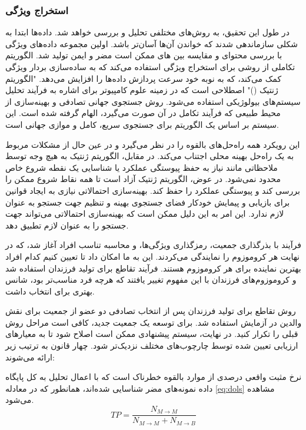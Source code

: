 \documentclass{CSICC2020}
\begin{document}
	\subsubsection{استخراج ویژگی}
	در طول این تحقیق،  به روش‌های مختلفی تحلیل و بررسی خواهد شد. داده‌ها ابتدا به شکلی سازماندهی شدند که خواندن آن‌ها آسان‌تر باشد. اولین مجموعه داده‌های ویژگی با بررسی محتوای  و مقایسه بین های ممکن است مضر و ایمن تولید شد. الگوریتم تکاملی از روشی برای استخراج ویژگی استفاده می‌کند که به ساده‌سازی بردار ویژگی کمک می‌کند، که به نوبه خود سرعت پردازش داده‌ها را افزایش می‌دهد. "الگوریتم ژنتیک ()" اصطلاحی است که در زمینه علوم کامپیوتر برای اشاره به فرآیند تحلیل سیستم‌های بیولوژیکی استفاده می‌شود. روش جستجوی جهانی تصادفی و بهینه‌سازی از محیط طبیعی که فرآیند تکامل در آن صورت می‌گیرد، الهام گرفته شده است. این سیستم بر اساس یک الگوریتم برای جستجوی سریع، کامل و موازی جهانی است.
	
	این رویکرد همه راه‌حل‌های بالقوه را در نظر می‌گیرد و در عین حال از مشکلات مربوط به یک راه‌حل بهینه محلی اجتناب می‌کند. در مقابل، الگوریتم ژنتیک به هیچ وجه توسط ملاحظاتی مانند نیاز به حفظ پیوستگی عملکرد یا شناسایی یک نقطه شروع خاص محدود نمی‌شود. در عوض، الگوریتم ژنتیک آزاد است تا همه نقاط شروع ممکن را بررسی کند و پیوستگی عملکرد را حفظ کند. بهینه‌سازی احتمالاتی نیازی به ایجاد قوانین برای بازیابی و پیمایش خودکار فضای جستجوی بهینه و تنظیم جهت جستجو به عنوان لازم ندارد. این امر به این دلیل ممکن است که بهینه‌سازی احتمالاتی می‌تواند جهت جستجو را به عنوان لازم تطبیق دهد.
	
	فرآیند با بذرگذاری جمعیت، رمزگذاری ویژگی‌ها، و محاسبه تناسب افراد آغاز شد، که در نهایت هر کروموزوم را نمایندگی می‌کردند. این به ما امکان داد تا تعیین کنیم کدام افراد بهترین نماینده برای هر کروموزوم هستند. فرآیند تقاطع برای تولید فرزندان استفاده شد و کروموزوم‌های فرزندان با این مفهوم تغییر یافتند که هرچه فرد مناسب‌تر بود، شانس بهتری برای انتخاب داشت.
	
	روش تقاطع برای تولید فرزندان پس از انتخاب تصادفی دو عضو از جمعیت برای نقش والدین در آزمایش استفاده شد. برای توسعه یک جمعیت جدید، کافی است مراحل روش قبلی را تکرار کنید. در نهایت، سیستم پیشنهادی ممکن است اصلاح شود تا به معیارهای ارزیابی تعیین شده توسط چارچوب‌های مختلف  نزدیک‌تر شود. چهار قانون به ترتیب زیر ارائه می‌شوند:
	
	نرخ مثبت واقعی درصدی از موارد بالقوه خطرناک است که با اعمال تحلیل به کل پایگاه داده نمونه‌های مضر شناسایی شده‌اند، همانطور که در معادله \ref{eq:dols} مشاهده می‌شود.
	\begin{equation}
		TP = \frac{N_{M\rightarrow M}}{N_{M\rightarrow M} + N_{M\rightarrow B}}
		\label{eq:dols}
	\end{equation}
\end{document}
